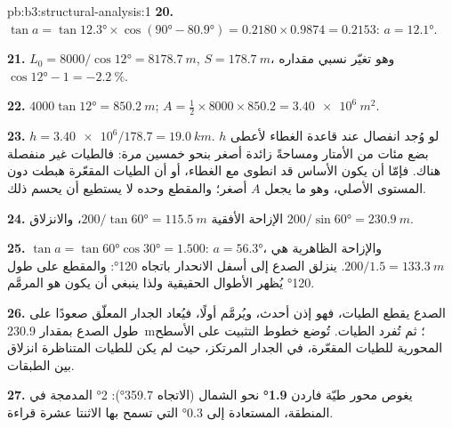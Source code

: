 \begin{solution}{pb:b3:structural-analysis:1}
\textbf{20.} $\tan a = \tan\ang{12.3}\times\cos(\ang{90} - \ang{80.9}) =
0.2180\times0.9874 = 0.2153$: $a = \ang{12.1}$.

\textbf{21.} $L_0 = 8000/\cos\ang{12} = \qty{8178.7}{m}$, $S =
\qty{178.7}{m}$، وهو تغيّر نسبي مقداره $\cos\ang{12} - 1 =
\qty{-2.2}{\percent}$.

\textbf{22.} $4000\tan\ang{12} = \qty{850.2}{m}$; $A = \tfrac12\times8000\times
850.2 = \qty{3.40e6}{m^2}$.

\textbf{23.} $h = \num{3.40e6}/178.7 = \qty{19.0}{km}$. لو وُجد انفصال عند
قاعدة الغطاء لأعطى $h$ بضع مئات من الأمتار ومساحةً زائدة
أصغر بنحو خمسين مرة: فالطيات غير منفصلة هناك.
فإمّا أن يكون الأساس قد انطوى مع الغطاء، أو أن الطيات المقعّرة هبطت دون
المستوى الأصلي، وهو ما يجعل $A$ أصغر؛ والمقطع وحده لا يستطيع أن يحسم ذلك.

\textbf{24.} الإزاحة الأفقية $200/\tan\ang{60} = \qty{115.5}{m}$، والانزلاق $200/\sin\ang{60}
= \qty{230.9}{m}$.

\textbf{25.} $\tan a = \tan\ang{60}\cos\ang{30} = 1.500$: $a = \ang{56.3}$،
والإزاحة الظاهرية هي $200/1.5 = \qty{133.3}{m}$. ينزلق الصدع
إلى أسفل الانحدار باتجاه \ang{120}: والمقطع على طول \ang{120} يُظهر الأطوال الحقيقية
ولذا ينبغي أن يكون هو المرمَّم.

\textbf{26.} الصدع يقطع الطيات، فهو إذن أحدث، ويُرمَّم أولًا،
فيُعاد الجدار المعلّق صعودًا على طول الصدع بمقدار \qty{230.9}{m}؛ ثم
تُفرد الطيات. تُوضع خطوط التثبيت على الأسطح المحورية للطيات المقعّرة، في
الجدار المرتكز، حيث لم يكن للطيات المتناظرة انزلاق بين الطبقات.

\textbf{27.} يغوص محور طيّة فاردن
\textbf{\ang[text-series-to-math=true]{1.9}} نحو الشمال (الاتجاه
\ang{359.7}): \ang{2} المدمجة في المنطقة، المستعادة إلى
\ang{0.3} التي تسمح بها الاثنتا عشرة قراءة.
\end{solution}
